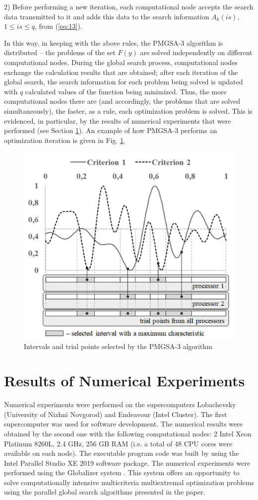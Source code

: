 \documentclass[review]{elsarticle}
\begin{document}
2) Before performing a new iteration, each computational node accepts the search data transmitted to it and adds this data to the search information $A_k (is)$, $1\leq is \leq q$, from (\ref{eq:13}).
	
In this way, in keeping with the above rules, the PMGSA-3 algorithm is distributed -- the problems of the set $F(y)$ are solved independently on different computational nodes. During the global search process, computational nodes exchange the calculation results that are obtained; after each iteration of the global search, the search information for each problem being solved is updated with $q$ calculated values of the function being minimized. Thus, the more computational nodes there are (and accordingly, the problems that are solved simultaneously), the faster, as a rule, each optimization problem is solved. This is evidenced, in particular, by the results of numerical experiments that were performed (see Section \ref{sec:5}). An example of how PMGSA-3 performs an optimization iteration is given in Fig. \ref{fig:4}.

\begin{figure}
  \centering
  \includegraphics[width=0.7\linewidth]{fig4}
  \caption{Intervals and trial points selected by the PMGSA-3 algorithm}
  \label{fig:4}
\end{figure}

\section{Results of Numerical Experiments}\label{sec:5}

Numerical experiments were performed on the supercomputers Lobachevsky (University of Nizhni Novgorod) and Endeavour (Intel Cluster). The first supercomputer was used for software development. The numerical results were obtained by the second one with the following computational nodes: 2 Intel Xeon Platinum 8260L, 2.4 GHz, 256 GB RAM (i.e. a total of 48 CPU cores were available on each node). The executable program code was built by using the Intel Parallel Studio XE 2019 software package. The numerical experiments were performed using the Globalizer system \cite{c36}. This system offers an opportunity to solve computationally intensive multicriteria multiextremal optimization problems using the parallel global search algorithms presented in the paper.
\end{document}
